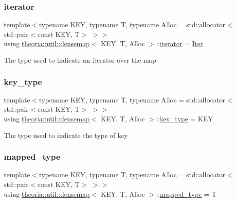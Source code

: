 \subsubsection{\texorpdfstring{iterator}{iterator}}
{\footnotesize\ttfamily template$<$typename K\+EY, typename T, typename Alloc = std\+::allocator$<$std\+::pair$<$const K\+E\+Y, T$>$ $>$$>$ \\
using \hyperlink{classtheoria_1_1util_1_1densemap}{theoria\+::util\+::densemap}$<$ K\+EY, T, Alloc $>$\+::\hyperlink{classtheoria_1_1util_1_1densemap_a4ee170442110252d3033534246f9677f}{iterator} =  \hyperlink{classtheoria_1_1util_1_1densemap_1_1Iter}{Iter}}

The type used to indicate an iterator over the map \mbox{\label{classtheoria_1_1util_1_1densemap_afd285a46dc8f45b4b1556a656708d2a7}} 
\subsubsection{\texorpdfstring{key\+\_\+type}{key\_type}}
{\footnotesize\ttfamily template$<$typename K\+EY, typename T, typename Alloc = std\+::allocator$<$std\+::pair$<$const K\+E\+Y, T$>$ $>$$>$ \\
using \hyperlink{classtheoria_1_1util_1_1densemap}{theoria\+::util\+::densemap}$<$ K\+EY, T, Alloc $>$\+::\hyperlink{classtheoria_1_1util_1_1densemap_afd285a46dc8f45b4b1556a656708d2a7}{key\+\_\+type} =  K\+EY}

The type used to indicate the type of key \mbox{\label{classtheoria_1_1util_1_1densemap_a8c1e5a57a1e76089bd675da3fa3347d8}} 
\subsubsection{\texorpdfstring{mapped\+\_\+type}{mapped\_type}}
{\footnotesize\ttfamily template$<$typename K\+EY, typename T, typename Alloc = std\+::allocator$<$std\+::pair$<$const K\+E\+Y, T$>$ $>$$>$ \\
using \hyperlink{classtheoria_1_1util_1_1densemap}{theoria\+::util\+::densemap}$<$ K\+EY, T, Alloc $>$\+::\hyperlink{classtheoria_1_1util_1_1densemap_a8c1e5a57a1e76089bd675da3fa3347d8}{mapped\+\_\+type} =  T}

